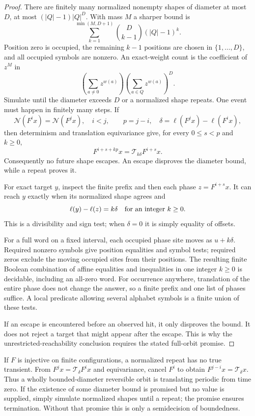 \documentclass[11pt,letterpaper]{article}
\numberwithin{equation}{section}
\theoremstyle{definition}
\theoremstyle{remark}
\newcommand{\norm}[1]{\mathcal N(#1)}
\begin{document}
\begin{proof}
There are finitely many normalized nonempty shapes of diameter at most $D$, at most $(|Q|-1)|Q|^D$. With mass $M$ a sharper bound is
\begin{equation}\label{smc:sl:eq:shape-count}
 \sum_{k=1}^{\min(M,D+1)}\binom D{k-1}(|Q|-1)^k.
\end{equation}
Position zero is occupied, the remaining $k-1$ positions are chosen in $\{1,\ldots,D\}$, and all occupied symbols are nonzero. An exact-weight count is the coefficient of $z^M$ in
\[
 \left(\sum_{a\ne0}z^{w(a)}\right)
 \left(\sum_{a\in Q}z^{w(a)}\right)^D.
\]
Simulate until the diameter exceeds $D$ or a normalized shape repeats. One event must happen in finitely many steps. If
\[
 \norm{F^i x}=\norm{F^j x},\quad i<j,
 \qquad p=j-i,\quad \delta=\ell(F^j x)-\ell(F^i x),
\]
then determinism and translation equivariance give, for every $0\le s<p$ and $k\ge0$,
\begin{equation}\label{smc:sl:eq:translate-tail}
 F^{i+s+kp}x=\mathcal T_{k\delta}F^{i+s}x.
\end{equation}
Consequently no future shape escapes. An escape disproves the diameter bound, while a repeat proves it.

For exact target $y$, inspect the finite prefix and then each phase $z=F^{i+s}x$. It can reach $y$ exactly when its normalized shape agrees and
\[
 \ell(y)-\ell(z)=k\delta\quad\hbox{for an integer }k\ge0.
\]
This is a divisibility and sign test; when $\delta=0$ it is simply equality of offsets.

For a full word on a fixed interval, each occupied phase site moves as $u+k\delta$. Required nonzero symbols give position equalities and symbol tests; required zeros exclude the moving occupied sites from their positions. The resulting finite Boolean combination of affine equalities and inequalities in one integer $k\ge0$ is decidable, including an all-zero word. For occurrence anywhere, translation of the entire phase does not change the answer, so a finite prefix and one list of phases suffice. A local predicate allowing several alphabet symbols is a finite union of these tests.

If an escape is encountered before an observed hit, it only disproves the bound. It does not reject a target that might appear after the escape. This is why the unrestricted-reachability conclusion requires the stated full-orbit promise.
\end{proof}

If $F$ is injective on finite configurations, a normalized repeat has no true transient. From $F^j x=\mathcal T_\delta F^i x$ and equivariance, cancel $F^i$ to obtain $F^{j-i}x=\mathcal T_\delta x$. Thus a wholly bounded-diameter reversible orbit is translating periodic from time zero. If the existence of some diameter bound is promised but no value is supplied, simply simulate normalized shapes until a repeat; the promise ensures termination. Without that promise this is only a semidecision of boundedness.
\end{document}
